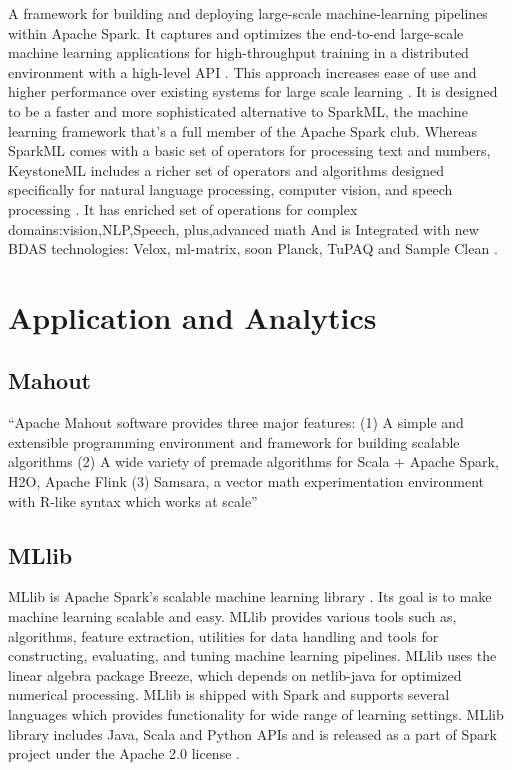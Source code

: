     A framework for building and deploying large-scale
    machine-learning pipelines within Apache Spark. It captures and
    optimizes the end-to-end large-scale machine learning applications
    for high-throughput training in a distributed environment with a
    high-level API \cite{sparks2016keystoneml}. This approach
    increases ease of use and higher performance over existing systems
    for large scale learning \cite{sparks2016keystoneml}. It is
    designed to be a faster and more sophisticated alternative to
    SparkML, the machine learning framework that’s a full member of
    the Apache Spark club. Whereas SparkML comes with a basic set of
    operators for processing text and numbers, KeystoneML includes a
    richer set of operators and algorithms designed specifically for
    natural language processing, computer vision, and speech
    processing \cite{building}. It has enriched set of operations for
    complex domains:vision,NLP,Speech, plus,advanced math And is
    Integrated with new BDAS technologies: Velox, ml-matrix, soon
    Planck, TuPAQ and Sample Clean \cite{spark}.

\section{Application and Analytics}
\label{S:o-application}

\subsection{Mahout}

    ``Apache Mahout software provides three major features:
    (1) A simple and extensible programming environment and framework
    for building scalable algorithms
    (2) A wide variety of premade algorithms for Scala + Apache Spark,
    H2O, Apache Flink
    (3) Samsara, a vector math experimentation environment with R-like
    syntax which works at scale'' \cite{www-mahout}


\subsection{MLlib}

    MLlib is Apache Spark’s scalable machine learning library
    \cite{www-mllib}. Its goal is to make machine learning scalable
    and easy. MLlib provides various tools such as, algorithms,
    feature extraction, utilities for data handling and tools for
    constructing, evaluating, and tuning machine learning
    pipelines. MLlib uses the linear algebra package Breeze, which
    depends on netlib-java for optimized numerical processing. MLlib
    is shipped with Spark and supports several languages which
    provides functionality for wide range of learning settings. MLlib
    library includes Java, Scala and Python APIs and is released as a
    part of Spark project under the Apache 2.0 license
    \cite{MLlib-article}.

